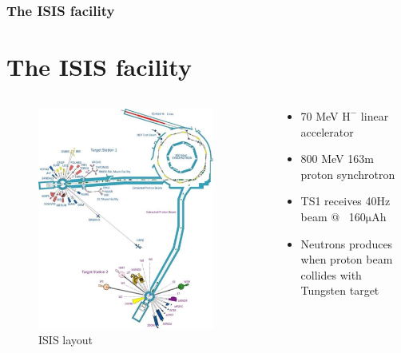 \documentclass[10pt,serif,t]{beamer}
\newenvironment{Slide}[1]
{
\begin{frame}[fragile,environment=Slide]
  \frametitle{#1}
  \section{#1}
}
{
\end{frame}
}
\begin{document}
\begin{Slide}{The ISIS facility}
  \begin{columns}[T]
    \begin{column}{.55\textwidth}
      \begin{figure}[h!]
        \centering
        \includegraphics[width=0.9\textwidth]{graphics/isis_diagram.eps}
        \caption{ISIS layout \cite{isis_website}}
        \label{fig:isis_diagram}
      \end{figure}
    \end{column}
    \hfill
    \begin{column}{.44\textwidth}
      \begin{itemize}
        \item 70 MeV $\mathrm{H}^{-}$ linear accelerator
        \item 800 MeV 163m proton synchrotron
        \item TS1 receives 40Hz beam @ ~160$\mathrm{\mu Ah}$
        \item Neutrons produces when proton beam collides with Tungsten target
      \end{itemize}
    \end{column}
  \end{columns}
\end{Slide}
\end{document}
